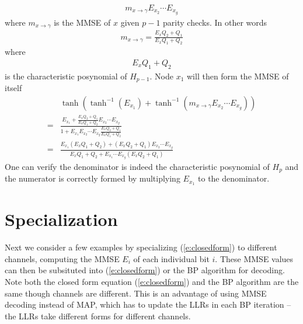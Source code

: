 \documentclass[12pt]{article}
\begin{document}
\begin{align*}
m_{x\rightarrow\gamma}E_{x_2}\cdots E_{x_g}
\end{align*}
where $m_{x\rightarrow\gamma}$ is the MMSE of $x$ given $p-1$ parity checks. In other words
\begin{align}
m_{x\rightarrow\gamma} = \frac{E_xQ_2+Q_1}{E_xQ_1+Q_2}
\end{align}
where 
\begin{align*}
E_xQ_1+Q_2
\end{align*}
is the characteristic posynomial of $H_{p-1}$. Node $x_1$ will then form the MMSE of itself
\begin{align}
&\tanh\left(\tanh^{-1}(E_{x_1})+\tanh^{-1}\left(m_{x\rightarrow\gamma}E_{x_2}\cdots E_{x_g}\right)\right)\\
=&\frac{E_{x_1}+\frac{E_xQ_2+Q_1}{E_xQ_1+Q_2}E_{x_2}\cdots E_{x_g}}{1+E_{x_1}E_{x_2}\cdots E_{x_g}\frac{E_xQ_2+Q_1}{E_xQ_1+Q_2}}\\
=&\frac{E_{x_1}(E_xQ_1+Q_2)+(E_xQ_2+Q_1)E_{x_2}\cdots E_{x_g}}{E_xQ_1+Q_2+E_{x_1}\cdots E_{x_g}(E_xQ_2+Q_1)}
\end{align}
One can verify the denominator is indeed the characteristic posynomial of $H_p$ and the numerator is correctly formed by multiplying $E_{x_1}$ to the denominator.

\section{Specialization}
Next we consider a few examples by specializing (\ref{e:closedform}) to different channels, computing the MMSE $E_i$ of each individual bit $i$. These MMSE values can then be subsituted into (\ref{e:closedform}) or the BP algorithm for decoding. Note both the closed form equation (\ref{e:closedform}) and the BP algorithm are the same though channels are different. This is an advantage of using MMSE decoding instead of MAP, which has to update the LLRs in each BP iteration -- the LLRs take different forms for different channels.
\end{document}
